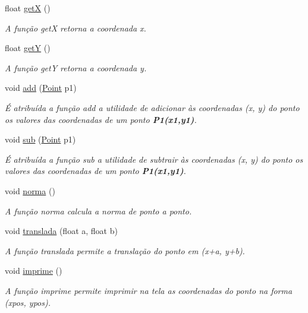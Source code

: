 \begin{DoxyCompactItemize}
float \hyperlink{class_point_acc27466778cc87a662bba40268c4c0c8}{getX} ()
\begin{DoxyCompactList}\small\item\em A função {\itshape getX} retorna a coordenada x. \end{DoxyCompactList}\item 
float \hyperlink{class_point_a3cccbca94719ddde353cce86ce0e2f64}{getY} ()
\begin{DoxyCompactList}\small\item\em A função {\itshape getY} retorna a coordenada y. \end{DoxyCompactList}\item 
void \hyperlink{class_point_a6bcf8fd2524ecc4d5b6c1dc942d541a5}{add} (\hyperlink{class_point}{Point} p1)
\begin{DoxyCompactList}\small\item\em É atribuída a função {\itshape add} a utilidade de adicionar às coordenadas (x, y) do ponto os valores das coordenadas de um ponto {\bfseries P1(x1,y1)}. \end{DoxyCompactList}\item 
void \hyperlink{class_point_af7d9e533f0030edf4ab28fdc0f12acd4}{sub} (\hyperlink{class_point}{Point} p1)
\begin{DoxyCompactList}\small\item\em É atribuída a função {\itshape sub} a utilidade de subtrair às coordenadas (x, y) do ponto os valores das coordenadas de um ponto {\bfseries P1(x1,y1)}. \end{DoxyCompactList}\item 
void \hyperlink{class_point_a6233714649b03294a020827fb53eb8ad}{norma} ()
\begin{DoxyCompactList}\small\item\em A função {\itshape norma} calcula a norma de ponto a ponto. \end{DoxyCompactList}\item 
void \hyperlink{class_point_ad9676e36f3444534b609e3c68422239a}{translada} (float a, float b)
\begin{DoxyCompactList}\small\item\em A função {\itshape translada} permite a translação do ponto em (x+a, y+b). \end{DoxyCompactList}\item 
void \hyperlink{class_point_a1fb5c2501c27ab2cbc99d06c2a26a741}{imprime} ()
\begin{DoxyCompactList}\small\item\em A função {\itshape imprime} permite imprimir na tela as coordenadas do ponto na forma (xpos, ypos). \end{DoxyCompactList}\item 

\end{DoxyCompactItemize}
